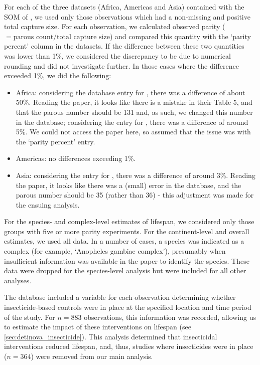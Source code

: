 \documentclass[12pt]{article}
\begin{document}
{For each of the three datasets (Africa, Americas and Asia) contained with the SOM of \cite{massey2016global}, we used only those observations which had a non-missing and positive total capture size. For each observation, we calculated observed parity ($=\text{parous count}/ \text{total capture size}$) and compared this quantity with the `parity percent' column in the datasets. If the difference between these two quantities was lower than 1\%, we considered the discrepancy to be due to numerical rounding and did not investigate further. In those cases where the difference exceeded 1\%, we did the following:

\begin{itemize}
	\item Africa: considering the database entry for \cite{ijumba2002malaria}, there was a difference of about 50\%. Reading the paper, it looks like there is a mistake in their Table 5, and that the parous number should be 131 and, as such, we changed this number in the database; considering the entry for \cite{bockarie46service}, there was a difference of around 5\%. We could not access the paper here, so assumed that the issue was with the `parity percent' entry.
	\item Americas: no differences exceeding 1\%.
	\item Asia: considering the entry for \cite{kitthawee1992relationship}, there was a difference of around 3\%. Reading the paper, it looks like there was a (small) error in the database, and the parous number should be 35 (rather than 36) - this adjustment was made for the ensuing analysis.
\end{itemize}

For the species- and complex-level estimates of lifespan, we considered only those groups with five or more parity experiments. For the continent-level and overall estimates, we used all data. In a number of cases, a species was indicated as a complex (for example, `Anopheles gambiae complex'), presumably when insufficient information was available in the paper to identify the species. These data were dropped for the species-level analysis but were included for all other analyses.


The \cite{massey2016global} database included a variable for each observation determining whether insecticide-based controls were in place at the specified location and time period of the study. For $n=883$ observations, this information was recorded, allowing us to estimate the impact of these interventions on lifespan (see \ref{sec:detinova_insecticide}). This analysis determined that insecticidal interventions reduced lifespan, and, thus, studies where insecticides were in place ($n=364$) were removed from our main analysis.


}
\end{document}
